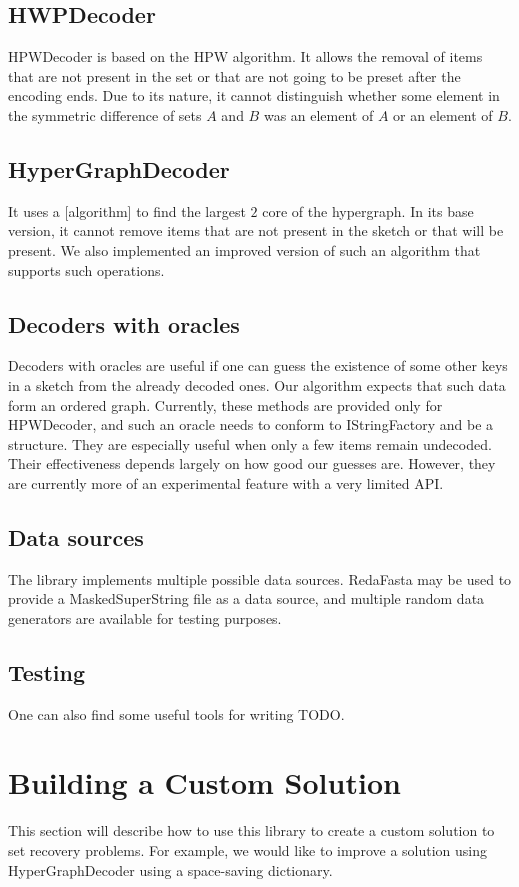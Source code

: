 \subsection{HWPDecoder}
HPWDecoder is based on the HPW algorithm. It allows the removal of items that are not present in the set or that are not going to be preset after the encoding ends. Due to its nature, it cannot distinguish whether some element in the symmetric difference of sets $A$ and $B$ was an element of $A$ or an element of $B$.

\subsection{HyperGraphDecoder}
It uses a [algorithm] to find the largest $2$ core of the hypergraph. In its base version, it cannot remove items that are not present in the sketch or that will be present. We also implemented an improved version of such an algorithm that supports such operations. 

\subsection{Decoders with oracles}
Decoders with oracles are useful if one can guess the existence of some other keys in a sketch from the already decoded ones. Our algorithm expects that such data form an ordered graph. Currently, these methods are provided only for HPWDecoder, and such an oracle needs to conform to IStringFactory and be a structure.
They are especially useful when only a few items remain undecoded. Their effectiveness depends largely on how good our guesses are. However, they are currently more of an experimental feature with a very limited API.

\subsection{Data sources}
The library implements multiple possible data sources. RedaFasta may be used to provide a MaskedSuperString file as a data source, and multiple random data generators are available for testing purposes.

\subsection{Testing}
One can also find some useful tools for writing TODO.


\section{Building a Custom Solution}
This section will describe how to use this library to create a custom solution to set recovery problems. For example, we would like to improve a solution using HyperGraphDecoder using a space-saving dictionary.

